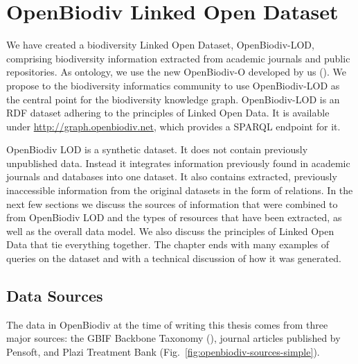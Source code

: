 \chapter{OpenBiodiv Linked Open Dataset}
\label{chapter-lod}


We have created a biodiversity Linked Open Dataset, \mbox{OpenBiodiv-LOD}, comprising biodiversity information extracted from academic journals and public repositories. As ontology, we use the new \mbox{OpenBiodiv-O} developed by us (\cite{senderov_openbiodiv-o:_2018}). We propose to the biodiversity informatics community to use OpenBiodiv-LOD as the central point for the biodiversity knowledge graph. OpenBiodiv-LOD is an RDF dataset adhering to the principles of Linked Open Data. It is available under \url{http://graph.openbiodiv.net}, which provides a SPARQL endpoint for it.

OpenBiodiv LOD is a synthetic dataset. It does not contain previously unpublished data. Instead it integrates information previously found in academic journals and databases into one dataset. It also contains extracted, previously inaccessible information from the original datasets in the form of relations. In the next few sections we discuss the sources of information that were combined to from OpenBiodiv LOD and the types of resources that have been extracted, as well as the overall data model. We also discuss the principles of Linked Open Data that tie everything together. The chapter ends with many examples of queries on the dataset and with a technical discussion of how it was generated.


\section{Data Sources}

The data in OpenBiodiv at the time of writing this thesis comes from three major sources: the GBIF Backbone Taxonomy (\cite{gbif_secretariat_gbif_2017}), journal articles published by Pensoft, and Plazi Treatment Bank (Fig.~\ref{fig:openbiodiv-sources-simple}).

